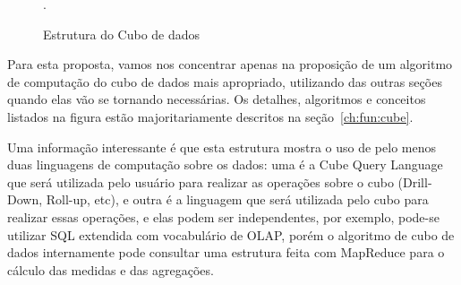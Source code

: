 \begin{figure}[ht]
	\caption{Estrutura do Cubo de dados}\label{fig:cubearch}
	\vspace{6mm}
	\begin{center}
	\end{center}
	\vspace{2mm}
	\legenda{}
	.
\end{figure}

Para esta proposta, vamos nos concentrar apenas na proposição de um algoritmo de computação do cubo de dados mais apropriado, utilizando das outras seções quando elas vão se tornando necessárias.
Os detalhes, algoritmos e conceitos listados na figura estão majoritariamente descritos na seção~\ref{ch:fun:cube}.

Uma informação interessante é que esta estrutura mostra o uso de pelo menos duas linguagens de computação sobre os dados: uma é a Cube Query Language que será utilizada pelo usuário para realizar as operações sobre o cubo (Drill-Down, Roll-up, etc), e outra é a linguagem que será utilizada pelo cubo para realizar essas operações, e elas podem ser independentes, por exemplo, pode-se utilizar SQL extendida com vocabulário de OLAP, porém o algoritmo de cubo de dados internamente pode consultar uma estrutura feita com MapReduce para o cálculo das medidas e das agregações.

